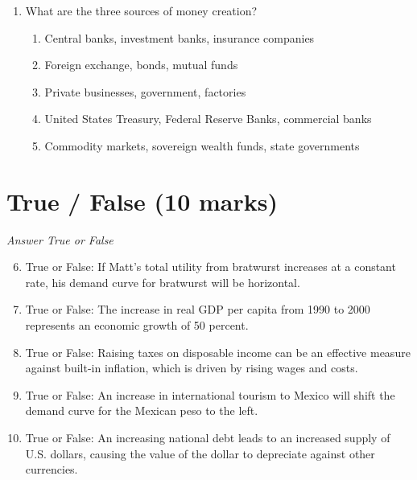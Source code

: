 \documentclass[12pt]{article}
\begin{document}
\begin{enumerate}[label=\arabic*.]
\begin{enumerate}[label=(\alph*)]
    \item the reserve ratio is decreased.
    \item the discount rate is decreased.
    \item the Fed reduces the amount of money in circulation.
    \item the discount rate is increased.
    \item the checking deposits increase.
\end{enumerate}
\item What are the three sources of money creation?
\begin{enumerate}[label=(\alph*)]
    \item Central banks, investment banks, insurance companies
    \item Foreign exchange, bonds, mutual funds
    \item Private businesses, government, factories
    \item United States Treasury, Federal Reserve Banks, commercial banks
    \item Commodity markets, sovereign wealth funds, state governments
\end{enumerate}
\end{enumerate}

\section*{True / False (10 marks)}
\textit{Answer True or False}
\begin{enumerate}[label=\arabic*.]
\setcounter{enumi}{5}
\item True or False: If Matt's total utility from bratwurst increases at a constant rate, his demand curve for bratwurst will be horizontal.
\item True or False: The increase in real GDP per capita from 1990 to 2000 represents an economic growth of 50 percent.
\item True or False: Raising taxes on disposable income can be an effective measure against built-in inflation, which is driven by rising wages and costs.
\item True or False: An increase in international tourism to Mexico will shift the demand curve for the Mexican peso to the left.
\item True or False: An increasing national debt leads to an increased supply of U.S. dollars, causing the value of the dollar to depreciate against other currencies.
\end{enumerate}
\end{document}
